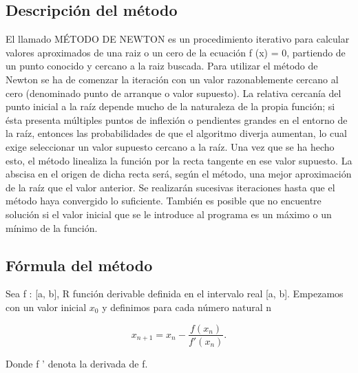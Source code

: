 \documentclass[a4paper,10pt]{article}
\begin{document}
\subsection{Descripción del método}
El llamado MÉTODO DE NEWTON es un procedimiento iterativo para calcular valores aproximados de una raiz o un cero de la ecuación f (x) = 0, partiendo de un punto conocido y cercano a la raiz buscada. 
Para utilizar el método de Newton se ha de comenzar la iteración con un valor razonablemente cercano al cero (denominado punto de arranque o valor supuesto). La relativa cercanía del punto inicial a la raíz depende mucho de la naturaleza de la propia función; si ésta presenta múltiples puntos de inflexión o pendientes grandes en el entorno de la raíz, entonces las probabilidades de que el algoritmo diverja aumentan, lo cual exige seleccionar un valor supuesto cercano a la raíz. Una vez que se ha hecho esto, el método linealiza la función por la recta tangente en ese valor supuesto. La abscisa en el origen de dicha recta será, según el método, una mejor aproximación de la raíz que el valor anterior. Se realizarán sucesivas iteraciones hasta que el método haya convergido lo suficiente.
También es posible que no encuentre solución si el valor inicial que se le introduce al programa es un máximo o un mínimo de la función.
\subsection{Fórmula del método}
Sea f : [a, b], R función derivable definida en el intervalo real [a, b]. Empezamos con un valor inicial $x_0$ y definimos para cada número natural n

   $$ x_{n+1} = x_n - \frac{f(x_n)}{f'(x_n)}.$$

Donde f ' denota la derivada de f.
\end{document}
